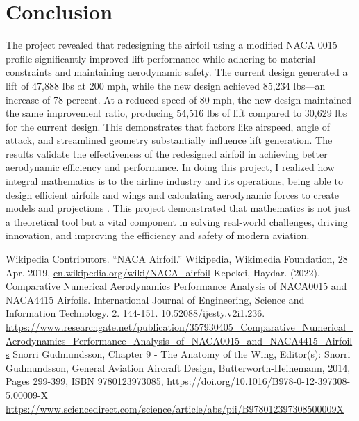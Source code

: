 \documentclass[12pt]{article}
\begin{document}
\section*{Conclusion}
The project revealed that redesigning the airfoil using a modified NACA 0015 profile significantly improved lift performance while adhering to material constraints and maintaining aerodynamic safety. The current design generated a lift of 47,888 lbs at 200 mph, while the new design achieved 85,234 lbs—an increase of 78 percent. At a reduced speed of 80 mph, the new design maintained the same improvement ratio, producing 54,516 lbs of lift compared to 30,629 lbs for the current design. This demonstrates that factors like airspeed, angle of attack, and streamlined geometry substantially influence lift generation. The results validate the effectiveness of the redesigned airfoil in achieving better aerodynamic efficiency and performance. In doing this project, I realized how integral mathematics is to the airline industry and its operations, being able to design efficient airfoils and wings and calculating aerodynamic forces to create models and projections . This project demonstrated that mathematics is not just a theoretical tool but a vital component in solving real-world challenges, driving innovation, and improving the efficiency and safety of modern aviation.












\begin{thebibliography}{2}
Wikipedia Contributors. “NACA Airfoil.” Wikipedia, Wikimedia Foundation, 28 Apr. 2019, 
\url{en.wikipedia.org/wiki/NACA_airfoil}
Kepekci, Haydar. (2022). Comparative Numerical Aerodynamics Performance Analysis of NACA0015 and NACA4415 Airfoils. International Journal of Engineering, Science and Information Technology. 2. 144-151. 10.52088/ijesty.v2i1.236.  
\url{https://www.researchgate.net/publication/357930405_Comparative_Numerical_Aerodynamics_Performance_Analysis_of_NACA0015_and_NACA4415_Airfoils}
Snorri Gudmundsson, Chapter 9 - The Anatomy of the Wing, Editor(s): Snorri Gudmundsson, General Aviation Aircraft Design, Butterworth-Heinemann,
2014, Pages 299-399, ISBN 9780123973085,
https://doi.org/10.1016/B978-0-12-397308-5.00009-X  
\url{https://www.sciencedirect.com/science/article/abs/pii/B978012397308500009X}




\end{thebibliography}
\end{document}
